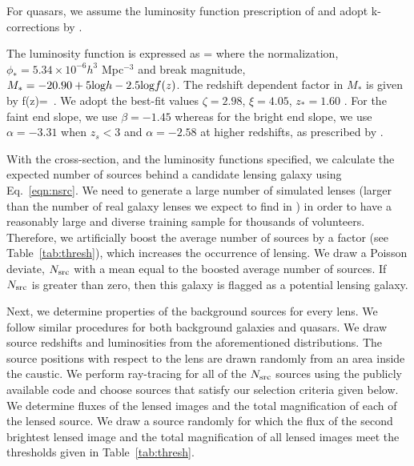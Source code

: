 \documentclass[useAMS,usenatbib,a4paper]{mn2e}
\begin{document}
For quasars, we assume the luminosity function prescription of \citep{Oguri2010}
and adopt k-corrections by \citep{Richards2006}.

The luminosity function is expressed as
\be
{}=
\ee
where the normalization, $\phi_{*}=5.34\times10^{-6} h^3$ Mpc$^{-3}$ and break
magnitude, $M_*=-20.90 + 5 {\rm log} h - 2.5 {\rm log} f(z)$. The redshift
dependent factor in $M_*$ is given by
\be
f(z)= \,.
\ee
We adopt the best-fit values $\zeta=2.98$, $\xi=4.05$, $z_{*}=1.60$
\citep{Oguri2010}. For the faint end slope, we use $\beta=-1.45$ whereas for
the bright end slope, we use $\alpha=-3.31$ when $z_s<3$ and $\alpha=-2.58$ at
higher redshifts, as prescribed by \citep{Oguri2010}.

With the cross-section, and the luminosity functions specified, we
calculate the expected number of sources behind a candidate lensing
galaxy using Eq.~\ref{eqn:nsrc}. We need to generate a large number of
simulated lenses (larger than the number of real galaxy lenses we expect
to find in \cfhtls) in order to have a reasonably large and diverse
training sample for thousands of \sw volunteers. Therefore, we
artificially boost the average number of sources by a factor (see
Table~\ref{tab:thresh}), which increases the occurrence of lensing. We
draw a Poisson deviate, $N_{\rm src}$ with a mean equal to the boosted
average number of sources. If $N_{\rm src}$ is greater than zero, then
this galaxy is flagged as a potential lensing galaxy.

Next, we determine properties of the background sources for every lens.
We follow similar procedures for both background galaxies and quasars.
We draw source redshifts and luminosities from the aforementioned
distributions. The source positions with respect to the lens are drawn
randomly from an area inside the caustic.  We perform ray-tracing for
all of the $N_{\rm src}$ sources using the publicly available code
\gravlens \citep{Keeton2000} and choose sources that satisfy our
selection criteria given below. We determine fluxes of the lensed images and the
total magnification of each of the lensed source. We draw a
source randomly for which the flux of the second brightest lensed image and the
total magnification of all lensed images meet the thresholds given
in Table~\ref{tab:thresh}.
\end{document}
